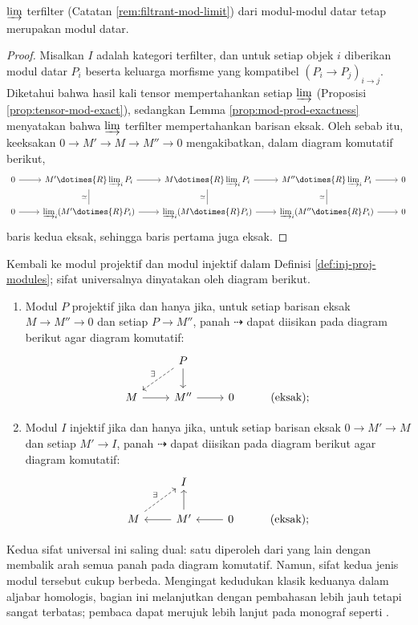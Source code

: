 \begin{proposition}
	$\varinjlim$ terfilter (Catatan \ref{rem:filtrant-mod-limit}) dari modul-modul datar tetap merupakan modul datar.
\end{proposition}
\begin{proof}
	Misalkan $I$ adalah kategori terfilter, dan untuk setiap objek $i$ diberikan modul datar $P_i$ beserta keluarga morfisme yang kompatibel $(P_i \to P_j)_{i \to j}$. Diketahui bahwa hasil kali tensor mempertahankan setiap $\varinjlim$ (Proposisi \ref{prop:tensor-mod-exact}), sedangkan Lemma \ref{prop:mod-prod-exactness} menyatakan bahwa $\varinjlim$ terfilter mempertahankan barisan eksak. Oleh sebab itu, keeksakan $0 \to M' \to M \to M'' \to 0$ mengakibatkan, dalam diagram komutatif berikut,
	\[ \begin{tikzcd}
		0 \arrow[r] & M' \dotimes{R} \varinjlim_i P_i \arrow[r] & M \dotimes{R} \varinjlim_i P_i \arrow[r] & M'' \dotimes{R} \varinjlim_i P_i \arrow[r] & 0 \\
		0 \arrow[r] & \varinjlim_i (M' \dotimes{R} P_i) \arrow[dash, u, "\simeq"] \arrow[r] & \varinjlim_i (M \dotimes{R} P_i) \arrow[dash, u, "\simeq"] \arrow[r] & \varinjlim_i (M'' \dotimes{R} P_i) \arrow[dash, u, "\simeq"] \arrow[r] & 0
	\end{tikzcd} \]
	baris kedua eksak, sehingga baris pertama juga eksak.
\end{proof}

Kembali ke modul projektif dan modul injektif dalam Definisi \ref{def:inj-proj-modules}; sifat universalnya dinyatakan oleh diagram berikut.
\begin{enumerate}
	\item Modul $P$ projektif jika dan hanya jika, untuk setiap barisan eksak $M \to M'' \to 0$ dan setiap $P \to M''$, panah $\dashrightarrow$ dapat diisikan pada diagram berikut agar diagram komutatif:
	\[\begin{tikzcd}
		& P \arrow[dashed, ld, "\exists"'] \arrow[d] & & \\
		M \arrow[r] & M'' \arrow[r] & 0 & \text{(eksak)};
	\end{tikzcd}\]
	\item Modul $I$ injektif jika dan hanya jika, untuk setiap barisan eksak $0 \to M' \to M$ dan setiap $M' \to I$, panah $\dashrightarrow$ dapat diisikan pada diagram berikut agar diagram komutatif:
	\[\begin{tikzcd}
		& I & & \\
		M \arrow[dashed, ru, "\exists"] & M' \arrow[l] \arrow[u] & 0 \arrow[l] & \text{(eksak)} ;
	\end{tikzcd}\]
\end{enumerate}
Kedua sifat universal ini saling dual: satu diperoleh dari yang lain dengan membalik arah semua panah pada diagram komutatif. Namun, sifat kedua jenis modul tersebut cukup berbeda. Mengingat kedudukan klasik keduanya dalam aljabar homologis, bagian ini melanjutkan dengan pembahasan lebih jauh tetapi sangat terbatas; pembaca dapat merujuk lebih lanjut pada monograf seperti \cite[Chapter 1]{Lam99}.

